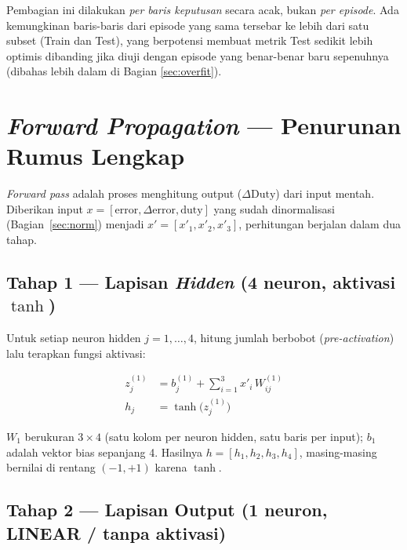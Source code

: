 \documentclass[11pt,a4paper]{article}
\begin{document}
\begin{notebox}
Pembagian ini dilakukan \emph{per baris keputusan} secara acak, bukan \emph{per episode}.
Ada kemungkinan baris-baris dari episode yang sama tersebar ke lebih dari satu subset
(Train dan Test), yang berpotensi membuat metrik Test sedikit lebih optimis dibanding jika
diuji dengan episode yang benar-benar baru sepenuhnya (dibahas lebih dalam di Bagian
\ref{sec:overfit}).
\end{notebox}

\section{\emph{Forward Propagation} --- Penurunan Rumus Lengkap}
\label{sec:forward}

\emph{Forward pass} adalah proses menghitung output ($\Delta\mathrm{Duty}$) dari input
mentah. Diberikan input $x=[\mathrm{error},\Delta\mathrm{error},\mathrm{duty}]$ yang sudah
dinormalisasi (Bagian~\ref{sec:norm}) menjadi $x' = [x'_1,x'_2,x'_3]$, perhitungan
berjalan dalam dua tahap.

\subsection{Tahap 1 --- Lapisan \emph{Hidden} (4 neuron, aktivasi $\tanh$)}

Untuk setiap neuron hidden $j = 1,\dots,4$, hitung jumlah berbobot (\emph{pre-activation})
lalu terapkan fungsi aktivasi:

\begin{formulabox}
\begin{align}
  z^{(1)}_j &= b^{(1)}_j + \sum_{i=1}^{3} x'_i \, W^{(1)}_{ij} \label{eq:z1}\\
  h_j &= \tanh\!\big(z^{(1)}_j\big) \label{eq:h}
\end{align}
\end{formulabox}

$W_1$ berukuran $3\times4$ (satu kolom per neuron hidden, satu baris per input); $b_1$
adalah vektor bias sepanjang 4. Hasilnya $h=[h_1,h_2,h_3,h_4]$, masing-masing bernilai di
rentang $(-1,+1)$ karena $\tanh$.

\subsection{Tahap 2 --- Lapisan Output (1 neuron, LINEAR / tanpa aktivasi)}
\end{document}
